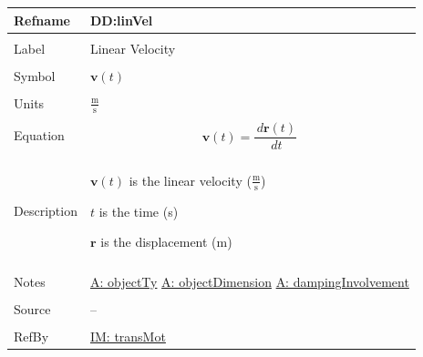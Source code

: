 \documentclass[12pt]{article}
\begin{document}
\noindent \begin{minipage}{\textwidth}
          \begin{tabular}{>{\raggedright}p{}>{\raggedright\arraybackslash}p{}}
          \toprule \textbf{Refname} & \textbf{DD:linVel}
          \label{DD:linVel}
          \\ \midrule \\
          Label & Linear Velocity
          \\ \midrule \\
          Symbol & $\mathbf{v}(t)$
          \\ \midrule \\
          Units & $\frac{\text{m}}{\text{s}}$
          \\ \midrule \\
          Equation & \begin{displaymath}
                     \mathbf{v}(t)=\frac{\,d\mathbf{r}\left(t\right)}{\,dt}
                     \end{displaymath}
          \\ \midrule \\
          Description & \begin{symbDescription}
                        \item{$\mathbf{v}(t)$ is the linear velocity ($\frac{\text{m}}{\text{s}}$)}
                        \item{$t$ is the time (s)}
                        \item{$\mathbf{r}$ is the displacement (m)}
                        \end{symbDescription}
          \\ \midrule \\
          Notes & \hyperref[assumpOT]{A: objectTy}
                  \hyperref[assumpOD]{A: objectDimension}
                  \hyperref[assumpDI]{A: dampingInvolvement}
          \\ \midrule \\
          Source & --
          \\ \midrule \\
          RefBy & \hyperref[IM:transMot]{IM: transMot}
          \\ \bottomrule
          \end{tabular}
          \end{minipage}
\par~
\end{document}
